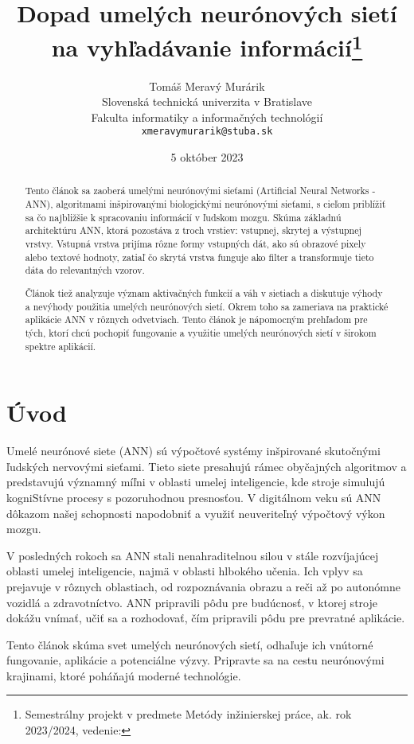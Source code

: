 \documentclass[10pt,twoside,slovak,a4paper]{article}
\title{Dopad umelých neurónových sietí na vyhľadávanie informácií\thanks{Semestrálny projekt v predmete Metódy inžinierskej práce, ak. rok 2023/2024, vedenie: }} %
\author{Tomáš Meravý Murárik\\[2pt]
	{\small Slovenská technická univerzita v Bratislave}\\
	{\small Fakulta informatiky a informačných technológií}\\
	{\small \texttt{xmeravymurarik@stuba.sk}}
	}
\date{\small 5 október 2023} %
\begin{document}
\maketitle
\begin{abstract}
Tento článok sa zaoberá umelými neurónovými sieťami (Artificial Neural Networks - ANN), algoritmami inšpirovanými biologickými neurónovými sieťami, s cieľom priblížiť sa čo najbližšie k spracovaniu informácií v ľudskom mozgu. Skúma základnú architektúru ANN, ktorá pozostáva z troch vrstiev: vstupnej, skrytej a výstupnej vrstvy. Vstupná vrstva prijíma rôzne formy vstupných dát, ako sú obrazové pixely alebo textové hodnoty, zatiaľ čo skrytá vrstva funguje ako filter a transformuje tieto dáta do relevantných vzorov.

Článok tiež analyzuje význam aktivačných funkcií a váh v sietiach a diskutuje výhody a nevýhody použitia umelých neurónových sietí. Okrem toho sa zameriava na praktické aplikácie ANN v rôznych odvetviach. Tento článok je nápomocným prehľadom pre tých, ktorí chcú pochopiť fungovanie a využitie umelých neurónových sietí v širokom spektre aplikácií.
\end{abstract}


\section{Úvod}\cite{yang2020artificial}

Umelé neurónové siete (ANN) sú výpočtové systémy inšpirované skutočnými ľudských nervovými sieťami. Tieto siete presahujú rámec obyčajných algoritmov a predstavujú významný míľni v oblasti umelej inteligencie, kde stroje simulujú kogniStívne procesy s pozoruhodnou presnosťou. V digitálnom veku sú ANN dôkazom našej schopnosti napodobniť a využiť neuveriteľný výpočtový výkon mozgu.

V posledných rokoch sa ANN stali nenahraditelnou silou v stále rozvíjajúcej oblasti umelej inteligencie, najmä v oblasti hlbokého učenia. Ich vplyv sa prejavuje v rôznych oblastiach, od rozpoznávania obrazu a reči až po autonómne vozidlá a zdravotníctvo. ANN pripravili pôdu pre budúcnosť, v ktorej stroje dokážu vnímať, učiť sa a rozhodovať, čím pripravili pôdu pre prevratné aplikácie.

Tento článok skúma svet umelých neurónových sietí, odhaľuje ich vnútorné fungovanie, aplikácie a potenciálne výzvy. Pripravte sa na cestu neurónovými krajinami, ktoré poháňajú moderné technológie.
\end{document}
